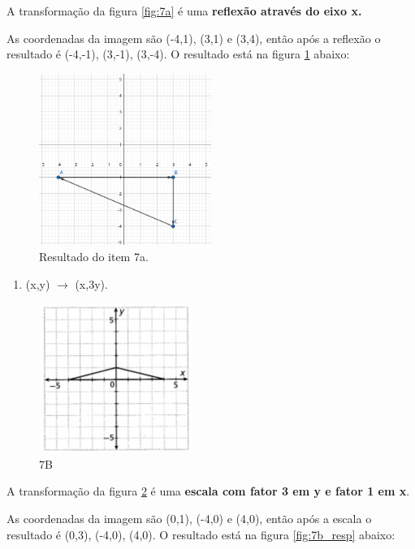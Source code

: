 \documentclass[12pt]{article}
\begin{document}
A transformação da figura \ref{fig:7a} é uma \textbf{reflexão através do eixo x.}

As coordenadas da imagem são (-4,1), (3,1) e (3,4), então após a reflexão o resultado é (-4,-1), (3,-1), (3,-4). O resultado está na figura \ref{fig:7a_resp} abaixo:

\begin{figure}[H]
    \centering
    \includegraphics[width=0.5\textwidth]{images/7a_resp.png}
    \caption{Resultado do item 7a.}
    \label{fig:7a_resp}
\end{figure}{}


\begin{enumerate}[label=\alph*), resume]
    \item (x,y) $\xrightarrow{}$ (x,3y). 
\end{enumerate}

\begin{figure}[H]
    \centering
    \includegraphics{images/7b.png}
    \caption{7B}
    \label{fig:7b}
\end{figure}{}

A transformação da figura \ref{fig:7b} é uma \textbf{escala com fator 3 em y e fator 1 em x}. 

As coordenadas da imagem são (0,1), (-4,0) e (4,0), então após a escala o resultado é (0,3), (-4,0), (4,0). O resultado está na figura \ref{fig:7b_resp} abaixo:
\end{document}
